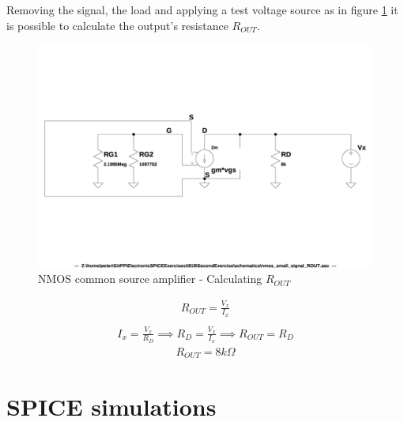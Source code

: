 \documentclass[10pt,a4paper]{book}
\begin{document}
Removing the signal, the load and applying a test voltage source as in figure \ref{nmos_pi_ROUT} it is possible to calculate the output's resistance $R_{OUT}$.\\

\begin{figure}[h]
  \centering
  \includegraphics[width=12cm]{schematics/nmos_small_signal_ROUT.jpg}
  \caption{NMOS common source amplifier - Calculating $R_{OUT}$}
  \label{nmos_pi_ROUT}
\end{figure}

\begin{align}
R_{OUT} = \frac{V_x}{I_x}\\
\end{align}
\begin{align}
I_x = \frac{V_x}{R_D} \implies R_D = \frac{V_x}{I_x} \implies R_{OUT} = R_D 
\end{align}
\begin{align}
R_{OUT} = 8k\Omega
\end{align}

\chapter{SPICE simulations}
\end{document}
